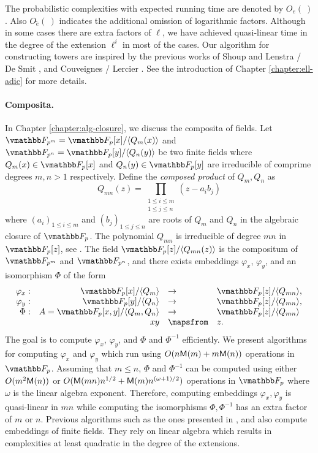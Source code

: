 \vspace*{4mm}
The probabilistic complexities with expected running time are denoted by $O_e(\ )$. Also
$O\tilde{_e}(\ )$ indicates the additional omission of logarithmic factors. Although in some cases 
there are extra factors of $\ell$, we have achieved quasi-linear time in the degree of the 
extension $\ell^i$ in most of the cases. Our algorithm for constructing towers are inspired by the
previous works of Shoup \cite{Shoup90,shoup94} and Lenstra / De Smit 
\cite{lenstra+desmit08-stdmodels}, and Couveignes / Lercier \cite{couveignes+lercier11}. See the 
introduction of Chapter \ref{chapter:ell-adic} for more details.

\paragraph{Composita.} In Chapter \ref{chapter:alg-closure}, we discuss the composita of fields. 
Let $\F_{p^m} = \F_p[x] / \ang{Q_m(x)}$ and $\F_{p^n} = \F_p[y] / \ang{Q_n(y)}$ be two finite 
fields where $Q_m(x) \in \F_p[x]$ and $Q_n(y) \in \F_p[y]$ are irreducible of comprime degrees $m, 
n > 1$ respectively. Define the \textit{composed product} of $Q_m, Q_n$ as
\[ Q_{mn}(z) = \prod_{\substack{1 \le i \le m \\ 1 \le j \le n}} (z- a_i b_j) \]
where $(a_i)_{1 \le i \le m}$ and $(b_j)_{1 \le j \le n}$ are roots of $Q_m$ and $Q_n$ in the 
algebraic closure of $\F_p$. The polynomial $Q_{mn}$ is irreducible of degree $mn$ in $\F_p[z]$, 
see \cite{Brawley1987}. The field $\F_p[z] / \ang{Q_{mn}(z)}$ is the compositum of $\F_{p^m}$ and 
$\F_{p^n}$, and there exists embeddings $\varphi_x$, $\varphi_y$, and an isomorphism $\Phi$ of the 
form
$$
\begin{array}{rrll}
\varphi_x: & \F_p[x]/\ang{Q_m} & \to & \F_p[z]/\ang{Q_{mn}},\\
\varphi_y: & \F_p[y]/\ang{Q_n} & \to & \F_p[z]/\ang{Q_{mn}},\\
\Phi:&  A=\F_p[x,y]/\ang{Q_m,Q_n} & \to & \F_p[z]/\ang{Q_{mn}} \\
&  xy & \mapsfrom & z.
\end{array}$$
The goal is to compute $\varphi_x$, $\varphi_y$, and $\Phi$ and $\Phi^{-1}$ efficiently. We present 
algorithms for computing $\varphi_x$ and $\varphi_y$ which run using $O(n\mathsf{M}(m)+m\mathsf{M}(n))$ 
operations in $\F_p$. Assuming that $m \le n$, $\Phi$ and $\Phi^{-1}$ can be computed using either 
$O(m^2 \mathsf{M}(n))$ or $O(\mathsf{M}(mn)n^{1/2}+\mathsf{M}(m)n^{(\omega+1)/2} )$ operations in $\F_p$ where $\omega$ 
is the linear algebra exponent. Therefore, computing embeddings $\varphi_x, \varphi_y$ is 
quasi-linear in $mn$ while computing the isomorphisms $\Phi, \Phi^{-1}$ has an extra factor of $m$ 
or $n$. Previous algorithms such as the ones presented in \cite{bosma+cannon+steel97}, and 
\cite{LenstraJr91,Allombert02} also compute embeddings of finite fields. They rely on linear 
algebra which results in complexities at least quadratic in the degree of the extensions.


